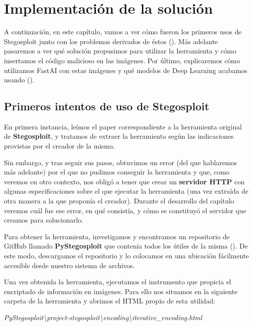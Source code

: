 \chapter{Implementación de la solución}
\label{ch:stego}

A continuación, en este capítulo, vamos a ver cómo fueron los primeros usos de Stegosploit junto con los problemas derivados de éstos (\cite{stegosploit}). Más adelante pasaremos a ver qué solución propusimos para utilizar la herramienta y cómo insertamos el código malicioso en las imágenes. Por último, explicaremos cómo utilizamos FastAI con estas imágenes y qué modelos de Deep Learning acabamos usando (\cite{fastai}). %

\section{Primeros intentos de uso de Stegosploit}
\label{sec:stego_1}

En primera instancia, leímos el paper correspondiente a la herramienta original de \textbf{Stegosploit}, y tratamos de extraer la herramienta según las indicaciones provistas por el creador de la misma.

Sin embargo, y tras seguir sus pasos, obtuvimos un error (del que hablaremos más adelante) por el que no pudimos conseguir la herramienta y que, como veremos en otro contexto, nos obligó a tener que crear un \textbf{servidor HTTP} con algunas especificaciones sobre el que ejecutar la herramienta (una vez extraída de otra manera a la que proponía el creador). Durante el desarrollo del capítulo veremos cuál fue ese error, en qué consistía, y cómo se constituyó el servidor que creamos para solucionarlo.

Para obtener la herramienta, investigamos y encontramos un repositorio de GitHub llamado \textbf{PyStegosploit} que contenía todos los útiles de la misma (\cite{pystegosploit}). De este modo, descargamos el repositorio y lo colocamos en una ubicación fácilmente accesible desde nuestro sistema de archivos.

Una vez obtenida la herramienta, ejecutamos el instrumento que propicia el encriptado de información en imágenes. Para ello nos situamos en la siguiente carpeta de la herramienta y abrimos el HTML propio de esta utilidad:

\begin{center}
\textit{PyStegosploit\textbackslash{project-stegosploit}\textbackslash{encoding}\textbackslash{iterative\_encoding.html}}
\end{center}

